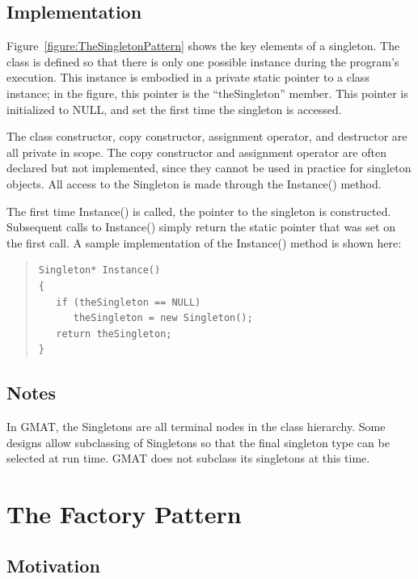 \subsection{Implementation}

Figure~\ref{figure:TheSingletonPattern} shows the key elements of a singleton.  The class is
defined so that there is only one possible instance during the program's execution.  This instance
is embodied in a private static pointer to a class instance; in the figure, this pointer is the
``theSingleton'' member.  This pointer is initialized to NULL, and set the first time the singleton
is accessed.

The class constructor, copy constructor, assignment operator, and destructor are all private in
scope.  The copy constructor and assignment operator are often declared but not implemented, since
they cannot be used in practice for singleton objects.  All access to the Singleton is made through
the Instance() method.

The first time Instance() is called, the pointer to the singleton is constructed.  Subsequent calls
to Instance() simply return the static pointer that was set on the first call.  A sample
implementation of the Instance() method is shown here:

\begin{quote}
\begin{verbatim}
Singleton* Instance()
{
   if (theSingleton == NULL)
      theSingleton = new Singleton();
   return theSingleton;
}
\end{verbatim}
\end{quote}

\subsection{Notes}

In GMAT, the Singletons are all terminal nodes in the class hierarchy.  Some designs allow
subclassing of Singletons so that the final singleton type can be selected at run time.  GMAT does
not subclass its singletons at this time.

\section{The Factory Pattern}

\subsection{Motivation}

